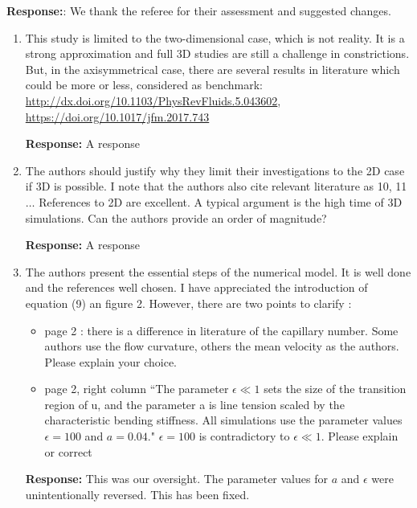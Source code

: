 \documentclass[11pt]{article}
\begin{document}
\noindent
{\bf Response:}: We thank the referee for their assessment and suggested
changes.

\begin{enumerate}
\item This study is limited to the two-dimensional case, which is not
  reality. It is a strong approximation and full 3D studies are still a
    challenge in constrictions. But, in the axisymmetrical case, there
    are several results in literature which could be more or less,
    considered as benchmark:
    \url{http://dx.doi.org/10.1103/PhysRevFluids.5.043602}, \\
    \url{https://doi.org/10.1017/jfm.2017.743}

\noindent
{\bf Response:} A response

\item The authors should justify why they limit their investigations to
  the 2D case if 3D is possible. I note that the authors also cite
    relevant literature as 10, 11 $\ldots$ References to 2D are
    excellent. A typical argument is the high time of 3D simulations.
    Can the authors provide an order of magnitude?

\noindent
{\bf Response:} A response

\item The authors present the essential steps of the numerical model. It
  is well done and the references well chosen. I have appreciated the
    introduction of equation (9) an figure 2. However, there are two
    points to clarify :
    \begin{itemize}
      \item page 2 : there is a difference in literature of the
        capillary number. Some authors use the flow curvature, others
        the mean velocity as the authors. Please explain your choice.
      \item page 2, right column ``The parameter $\epsilon \ll 1$ sets
        the size of the transition region of u, and the parameter a is
        line tension scaled by the characteristic bending stiffness. All
        simulations use the parameter values $\epsilon = 100$ and $a =
        0.04.$" $\epsilon = 100$ is contradictory to $\epsilon \ll 1$.
        Please explain or correct
    \end{itemize}

\noindent
{\bf Response:} This was our oversight. The parameter values for $a$ and
$\epsilon$ were unintentionally reversed. This has been fixed.


\end{enumerate}
\end{document}
